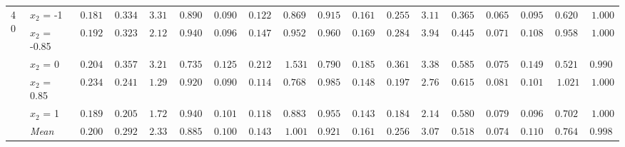\begin{table}[htbp]
\begin{tabular}{llrrrrrrrrrrrrrrrr}
\midrule
\multirow{6}{*}{40} & $x_2$ = -1 & $0.1813$ & $0.3345$ & $3.313$ & $0.8900$ & $0.0908$ & $0.1229$ & $0.8693$ & {\boldmath$0.9150$} & $0.1615$ & $0.2556$ & $3.114$ & $0.3650$ & {\boldmath$0.0650$} & {\boldmath$0.0951$} & {\boldmath$0.6201$} & $1.000$ \\
 & $x_2$ = -0.85 & $0.1926$ & $0.3230$ & $2.123$ & {\boldmath$0.9400$} & $0.0960$ & $0.1475$ & {\boldmath$0.9524$} & $0.9600$ & $0.1697$ & $0.2842$ & $3.947$ & $0.4450$ & {\boldmath$0.0711$} & {\boldmath$0.1088$} & $0.9587$ & $1.000$ \\
 & $x_2$ = 0 & $0.2048$ & $0.3579$ & $3.210$ & $0.7350$ & $0.1250$ & $0.2128$ & $1.531$ & $0.7900$ & $0.1858$ & $0.3612$ & $3.382$ & $0.5850$ & {\boldmath$0.0754$} & {\boldmath$0.1491$} & {\boldmath$0.5218$} & {\boldmath$0.9900$} \\
 & $x_2$ = 0.85 & $0.2345$ & $0.2416$ & $1.292$ & {\boldmath$0.9200$} & $0.0907$ & $0.1141$ & {\boldmath$0.7689$} & $0.9850$ & $0.1486$ & $0.1978$ & $2.761$ & $0.6150$ & {\boldmath$0.0810$} & {\boldmath$0.1011$} & $1.021$ & $1.000$ \\
 & $x_2$ = 1 & $0.1897$ & $0.2051$ & $1.722$ & $0.9400$ & $0.1013$ & $0.1188$ & $0.8838$ & {\boldmath$0.9550$} & $0.1433$ & $0.1848$ & $2.144$ & $0.5800$ & {\boldmath$0.0790$} & {\boldmath$0.0963$} & {\boldmath$0.7024$} & $1.000$ \\
 & \textit{Mean} & $0.2006$ & $0.2924$ & $2.332$ & $0.8850$ & $0.1008$ & $0.1432$ & $1.001$ & \colorbox{green!20}{\boldmath$0.9210$} & $0.1618$ & $0.2567$ & $3.070$ & $0.5180$ & \colorbox{green!20}{\boldmath$0.0743$} & \colorbox{green!20}{\boldmath$0.1101$} & \colorbox{green!20}{\boldmath$0.7647$} & $0.9980$ \\
\bottomrule
\end{tabular}
\end{table}

